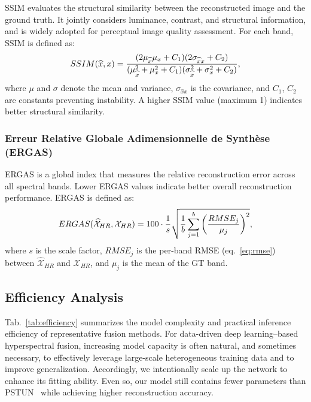 SSIM evaluates the structural similarity between the reconstructed image and the ground truth. 
It jointly considers luminance, contrast, and structural information, and is widely adopted 
for perceptual image quality assessment. For each band, SSIM is defined as:
\begin{equation}
    SSIM(\widehat{x}, x)
    = \frac{ (2\mu_{\widehat{x}}\mu_x + C_1)(2\sigma_{\widehat{x}x} + C_2) }
           { (\mu_{\widehat{x}}^2 + \mu_x^2 + C_1)(\sigma_{\widehat{x}}^2 + \sigma_x^2 + C_2) }, \notag
\end{equation}
where $\mu$ and $\sigma$ denote the mean and variance, 
$\sigma_{\widehat{x}x}$ is the covariance, and $C_1$, $C_2$ are constants preventing instability.
A higher SSIM value (maximum 1) indicates better structural similarity.

\subsubsection*{Erreur Relative Globale Adimensionnelle de Synthèse (ERGAS)}

ERGAS is a global index that measures the relative reconstruction error across all spectral bands. 
Lower ERGAS values indicate better overall reconstruction performance. ERGAS is defined as:
\begin{equation}
    ERGAS(\widehat{\mathcal{X}}_{HR}, \mathcal{X}_{HR})
    = 100 \cdot \frac{1}{s}
    \sqrt{ \frac{1}{b} \sum_{j=1}^{b}
    \left( \frac{ RMSE_{j} }{ \mu_{j} } \right)^2 }, \notag
\end{equation}
where $s$ is the scale factor, $RMSE_j$ is the per-band RMSE (eq.~\ref{eq:rmse}) between 
$\widehat{\mathcal{X}}_{HR}$ and $\mathcal{X}_{HR}$, and $\mu_j$ is the mean of the GT band.

\subsection{Efficiency Analysis}
\label{effana}
Tab.~\ref{tab:efficiency} summarizes the model complexity and practical inference efficiency of representative fusion methods.
For data-driven deep learning–based hyperspectral fusion, increasing model capacity is often natural, and sometimes necessary, to effectively leverage large-scale heterogeneous training data and to improve generalization.
Accordingly, we intentionally scale up the network to enhance its fitting ability.
Even so, our model still contains fewer parameters than PSTUN~\cite{wang2025perceptive} while achieving higher reconstruction accuracy.

